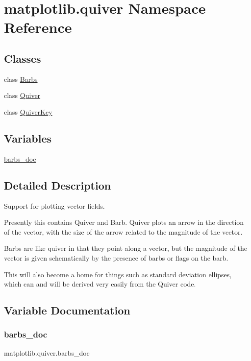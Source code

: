\hypertarget{namespacematplotlib_1_1quiver}{}\section{matplotlib.\+quiver Namespace Reference}
\label{namespacematplotlib_1_1quiver}
\subsection*{Classes}
\begin{DoxyCompactItemize}
\item 
class \hyperlink{classmatplotlib_1_1quiver_1_1Barbs}{Barbs}
\item 
class \hyperlink{classmatplotlib_1_1quiver_1_1Quiver}{Quiver}
\item 
class \hyperlink{classmatplotlib_1_1quiver_1_1QuiverKey}{Quiver\+Key}
\end{DoxyCompactItemize}
\subsection*{Variables}
\begin{DoxyCompactItemize}
\item 
\hyperlink{namespacematplotlib_1_1quiver_aefdbcaf507ec890e0933136cb0d59419}{barbs\+\_\+doc}
\end{DoxyCompactItemize}


\subsection{Detailed Description}
\begin{DoxyVerb}Support for plotting vector fields.

Presently this contains Quiver and Barb. Quiver plots an arrow in the
direction of the vector, with the size of the arrow related to the
magnitude of the vector.

Barbs are like quiver in that they point along a vector, but
the magnitude of the vector is given schematically by the presence of barbs
or flags on the barb.

This will also become a home for things such as standard
deviation ellipses, which can and will be derived very easily from
the Quiver code.
\end{DoxyVerb}
 

\subsection{Variable Documentation}
\mbox{\label{namespacematplotlib_1_1quiver_aefdbcaf507ec890e0933136cb0d59419}} 
\subsubsection{\texorpdfstring{barbs\+\_\+doc}{barbs\_doc}}
{\footnotesize\ttfamily matplotlib.\+quiver.\+barbs\+\_\+doc}

